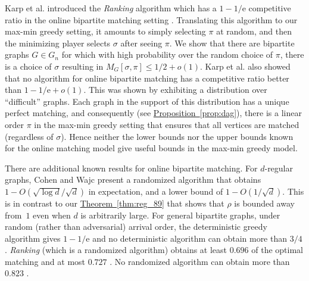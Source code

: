 \documentclass[11pt]{article}
\numberwithin{equation}{section}
\theoremstyle{definition}
\theoremstyle{plain}
\newcommand{\eee}{\mathrm e}
\newcommand{\expref}[2]{\hyperref[#2]{#1~\ref{#2}}}
\theoremstyle{plain}
\begin{document}
Karp et al. \cite{KarpVV1990} introduced the \emph{Ranking} algorithm which
has a %
$1-1/\eee$   %
competitive ratio in the online bipartite matching setting \cite{KarpVV1990,Goel2008}. Translating this algorithm to our max-min greedy setting, it amounts to simply selecting $\pi$ at random, and then the minimizing player selects $\sigma$ after seeing $\pi$. We show that there are bipartite graphs $G \in G_n$ for which with high probability over the random choice of $\pi$, there is a choice of $\sigma$ resulting in $M_G[\sigma,\pi] \le 1/2 + o(1)$. Karp et al. \cite{KarpVV1990} also showed that no algorithm for online bipartite matching has a competitive ratio better than %
$1 - 1/\eee + o(1)$.   %
This was shown by exhibiting a distribution over ``difficult'' graphs. Each graph in the support of this distribution has a unique perfect matching, and consequently (see \expref{Proposition}{prop:dag}), there is a linear order $\pi$ in the max-min greedy setting that ensures that all vertices are matched (regardless of $\sigma$). Hence neither the lower bounds nor the upper bounds known for the online matching model give useful bounds in the max-min greedy model.

There are additional known results for online bipartite matching.
For $d$-regular graphs, Cohen and Wajc \cite{CohenW18} present a
%
randomized  %
algorithm that obtains $1-O(\sqrt{\log d}/\sqrt{d})$ in expectation, and a lower bound of $1-O(1/\sqrt{d})$. This is in contrast to our \expref{Theorem}{thm:reg_89} that shows that $\rho$ is bounded away from~$1$ even when $d$ is arbitrarily large.
For general bipartite graphs, under random (rather than adversarial) arrival order, the deterministic greedy algorithm gives %
$1-1/\eee$    %
and no deterministic algorithm can obtain more than $3/4$ \cite{Goel2008}.
\emph{Ranking} (which is a randomized algorithm) obtains at least $0.696$ of the optimal matching \cite{Mahdian2011} and at most $0.727$ \cite{Karande2011}.
No %
randomized   %
algorithm can obtain more than $0.823$ \cite{Manshadi2012}.
\end{document}
